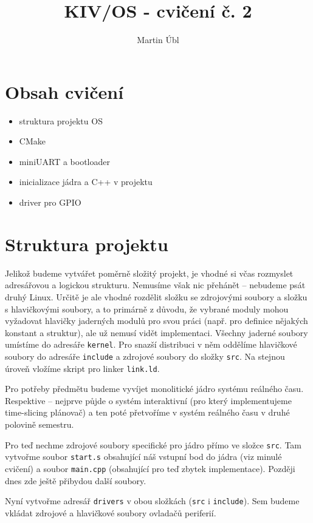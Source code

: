 \documentclass{article}
\author{Martin Úbl}
\title{KIV/OS - cvičení č. 2}
\begin{document}
\maketitle

\section{Obsah cvičení}

\begin{itemize}
	\item struktura projektu OS
	\item CMake
	\item miniUART a bootloader
	\item inicializace jádra a C++ v  projektu
	\item driver pro GPIO
\end{itemize}

\section{Struktura projektu}

Jelikož budeme vytvářet poměrně složitý projekt, je vhodné si včas rozmyslet adresářovou a logickou strukturu. Nemusíme však nic přehánět -- nebudeme psát druhý Linux. Určitě je ale vhodné rozdělit složku se zdrojovými soubory a složku s hlavičkovými soubory, a to primárně z důvodu, že vybrané moduly mohou vyžadovat hlavičky jaderných modulů pro svou práci (např. pro definice nějakých konstant a struktur), ale už nemusí vidět implementaci. Všechny jaderné soubory umístíme do adresáře \texttt{kernel}. Pro snazší distribuci v něm oddělíme hlavičkové soubory do adresáře \texttt{include} a zdrojové soubory do složky \texttt{src}. Na stejnou úroveň vložíme skript pro linker \texttt{link.ld}.

Pro potřeby předmětu budeme vyvíjet monolitické jádro systému reálného času. Respektive -- nejprve půjde o systém interaktivní (pro který implementujeme time-slicing plánovač) a ten poté přetvoříme v systém reálného času v druhé polovině semestru.

Pro teď nechme zdrojové soubory specifické pro jádro přímo ve složce \texttt{src}. Tam vytvořme soubor \texttt{start.s} obsahující náš vstupní bod do jádra (viz minulé cvičení) a soubor \texttt{main.cpp} (obsahující pro teď zbytek implementace). Později dnes zde ještě přibydou další soubory.

Nyní vytvořme adresář \texttt{drivers} v obou složkách (\texttt{src} i \texttt{include}). Sem budeme vkládat zdrojové a hlavičkové soubory ovladačů periferií.
\end{document}

